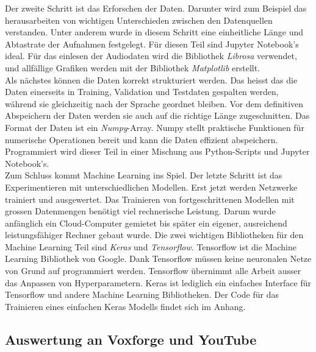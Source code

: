 Der zweite Schritt ist das Erforschen der Daten. Darunter wird zum Beispiel das herausarbeiten von wichtigen Unterschieden zwischen den Datenquellen verstanden. Unter anderem wurde in diesem Schritt eine einheitliche Länge und Abtastrate der Aufnahmen festgelegt. Für diesen Teil sind Jupyter Notebook's ideal.  Für das einlesen der Audiodaten wird die Bibliothek \textit{Librosa}\parencite{librosa} verwendet, und allfällige Grafiken werden mit der Bibliothek \textit{Matplotlib}\parencite{matplotlib} erstellt.
\\
Als nächstes können die Daten korrekt strukturiert werden. Das heisst das die Daten einerseits in Training, Validation und Testdaten gespalten werden, während sie gleichzeitig nach der Sprache geordnet bleiben. Vor dem definitiven Abspeichern der Daten werden sie auch auf die richtige Länge zugeschnitten. Das Format der Daten ist ein \textit{Numpy}-Array\parencite{numpy}. Numpy stellt praktische Funktionen für numerische Operationen bereit und kann die Daten effizient abspeichern. Programmiert wird dieser Teil in einer Mischung aus Python-Scripts und Jupyter Notebook's.
\\
Zum Schluss kommt Machine Learning ins Spiel. Der letzte Schritt ist das Experimentieren mit unterschiedlichen Modellen. Erst jetzt werden Netzwerke trainiert und ausgewertet. Das Trainieren von fortgeschrittenen Modellen mit grossen Datenmengen benötigt viel rechnerische Leistung. Darum wurde anfänglich ein Cloud-Computer gemietet bis später ein eigener, ausreichend leistungsfähiger Rechner gebaut wurde. Die zwei wichtigen Bibliotheken für den Machine Learning Teil sind \textit{Keras}\parencite{keras} und \textit{Tensorflow}\parencite{tensorflow}. Tensorflow ist die Machine Learning Bibliothek von Google. Dank Tensorflow müssen keine neuronalen Netze von Grund auf programmiert werden. Tensorflow übernimmt alle Arbeit ausser das Anpassen von Hyperparametern. Keras ist lediglich ein einfaches Interface für Tensorflow und andere Machine Learning Bibliotheken. Der Code für das Trainieren eines einfachen Keras Modells findet sich im Anhang.


\subsection{Auswertung an Voxforge und YouTube}

